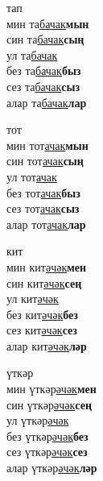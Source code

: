 \begin{multicols}{4}
\begin{enumerate}
\begin{minipage}{\linewidth}
    \item
    тап\\
    мин та\underline{бачак}\textbf{мын}\\
    син та\underline{бачак}\textbf{сың}\\
    ул та\underline{бачак}\\
    без та\underline{бачак}\textbf{быз}\\
    сез та\underline{бачак}\textbf{сыз}\\
    алар та\underline{бачак}\textbf{лар}\\
\end{minipage}

\begin{minipage}{\linewidth}
    \item
    тот\\
    мин тот\underline{ачак}\textbf{мын}\\
    син тот\underline{ачак}\textbf{сың}\\
    ул тот\underline{ачак}\\
    без тот\underline{ачак}\textbf{быз}\\
    сез тот\underline{ачак}\textbf{сыз}\\
    алар тот\underline{ачак}\textbf{лар}\\
\end{minipage}

\begin{minipage}{\linewidth}
    \item
    кит\\
    мин кит\underline{әчәк}\textbf{мен}\\
    син кит\underline{әчәк}\textbf{сең}\\
    ул кит\underline{әчәк}\\
    без кит\underline{әчәк}\textbf{без}\\
    сез кит\underline{әчәк}\textbf{сез}\\
    алар кит\underline{әчәк}\textbf{ләр}\\
\end{minipage}

\begin{minipage}{\linewidth}
    \item
    үткәр\\
    мин үткәр\underline{әчәк}\textbf{мен}\\
    син үткәр\underline{әчәк}\textbf{сең}\\
    ул үткәр\underline{әчәк}\\
    без үткәр\underline{әчәк}\textbf{без}\\
    сез үткәр\underline{әчәк}\textbf{сез}\\
    алар үткәр\underline{әчәк}\textbf{ләр}\\
\end{minipage}


\end{enumerate}
\end{multicols}
